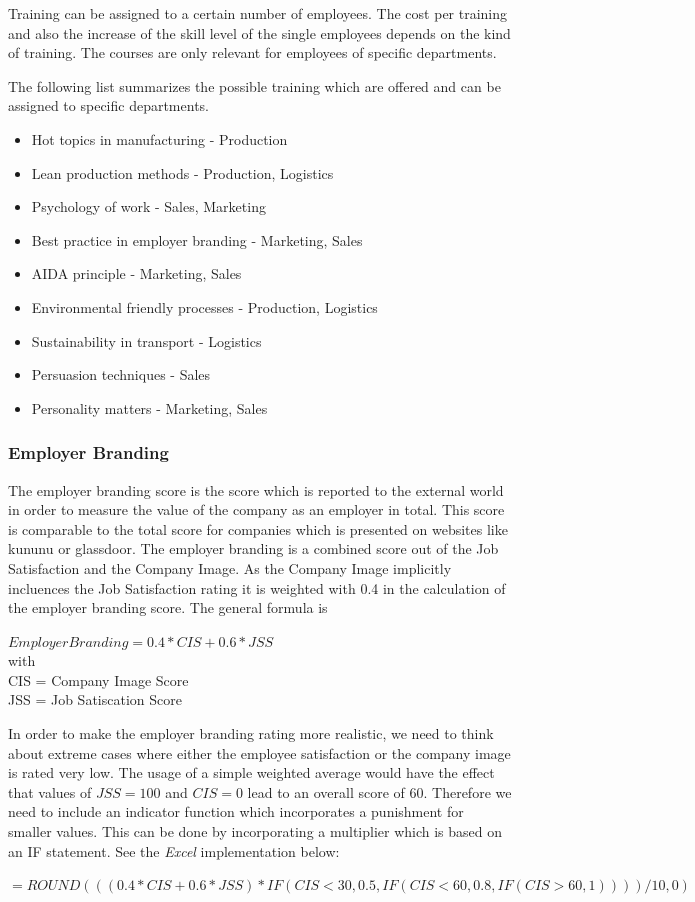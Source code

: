 Training can be assigned to a certain number of employees. The cost per training and also the increase of the skill level of the single employees depends on the kind of training. The courses are only relevant for employees of specific departments.

The following list summarizes the possible training which are offered and can be assigned to specific departments.
\begin{itemize}
\item Hot topics in manufacturing - Production
\item Lean production methods - Production, Logistics
\item Psychology of work - Sales, Marketing
\item Best practice in employer branding - Marketing, Sales
\item AIDA principle - Marketing, Sales
\item Environmental friendly processes - Production, Logistics
\item Sustainability in transport - Logistics
\item Persuasion techniques - Sales
\item Personality matters - Marketing, Sales
\end{itemize}

\subsubsection{Employer Branding}
The employer branding score is the score which is reported to the external world in order to measure the value of the company as an employer in total. This score is comparable to the total score for companies which is presented on websites like kununu or glassdoor. The employer branding is a combined score out of the Job Satisfaction and the Company Image. As the Company Image implicitly incluences the Job Satisfaction rating it is weighted with 0.4 in the calculation of the employer branding score. The general formula is
\begin{center}
$Employer Branding = 0.4 * CIS + 0.6 * JSS$ \\
with \\
CIS = Company Image Score   \\
JSS = Job Satiscation Score
\end{center}

In order to make the employer branding rating more realistic, we need to think about extreme cases where either the employee satisfaction or the company image is rated very low. The usage of a simple weighted average would have the effect that values of $JSS = 100$ and $CIS = 0$ lead to an overall score of 60.
Therefore we need to include an indicator function which incorporates a punishment for smaller values.
This can be done by incorporating a multiplier which is based on an IF statement. See the \textit{Excel} implementation below:
\begin{center}
    $=ROUND(((0.4*CIS+0.6*JSS)*IF(CIS<30,0.5,IF(CIS<60,0.8,IF(CIS>60,1))))/10,0)$
\end{center}

